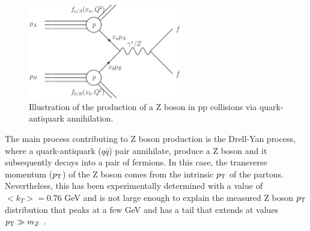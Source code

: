 \begin{figure}[h]
	\centering
	\includegraphics[width=0.6\textwidth]{figures/Fig15}
	\caption{Illustration of the production of a Z boson in pp collisions via quark-antiquark annihilation.}
	\label{Fig15}
\end{figure}
The main process contributing to Z boson production is the Drell-Yan process, where a quark-antiquark ($q\bar{q}$) pair annihilate, produce a Z boson and it subsequently decays into a pair of fermions. In this case, the transverse momentum ($p_\text{T}$) of the Z boson comes from the intrinsic $p_\text{T}$ of the partons. Nevertheless, this has been experimentally determined with a value of $<k_T>=0.76$ GeV \cite{Ellis:1991qj} and is not large enough to explain the measured Z boson $p_\text{T}$ distribution that peaks at a few GeV and has a tail that extends at values $p_\text{T}\gg m_Z$ \cite{Abbott:1999yd,Affolder:1999jh}.

